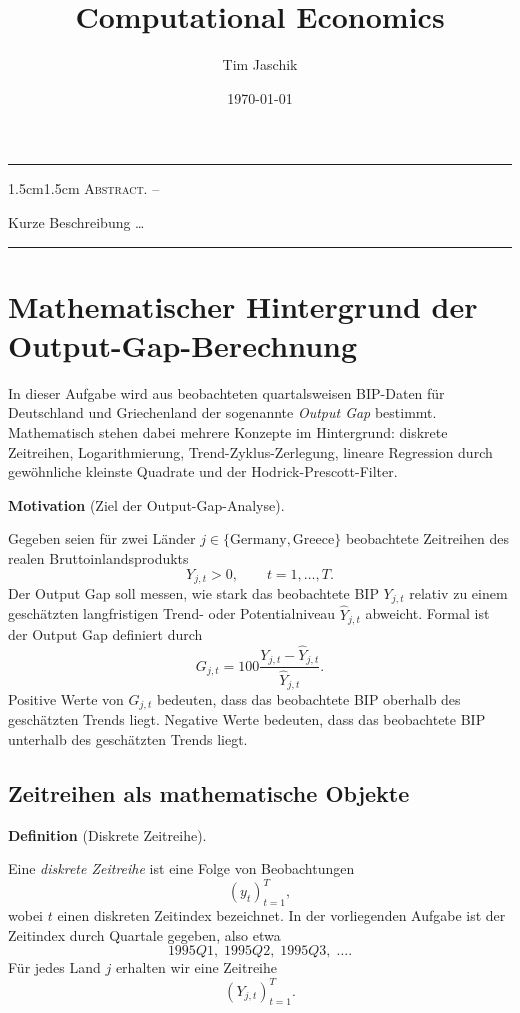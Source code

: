 \documentclass[10pt, letterpaper]{article}
\title{Computational Economics}
\author{Tim Jaschik}
\date{\today}
\renewenvironment{abstract}
  {
    \begin{adjustwidth}{1.5cm}{1.5cm}
    \small
    \textsc{Abstract. –}%
  }
  {
    \end{adjustwidth}
  }
\newcommand{\CustomHeading}[3]{%
  \par\medskip\noindent%
  \textbf{#1 #2} \textnormal{(#3)}.\enskip%
}
\newenvironment{DEF}[2]{\CustomHeading{Definition}{#1}{#2}}{}
\newenvironment{MOT}[2]{\CustomHeading{Motivation}{#1}{#2}}{}
\begin{document}
\maketitle
\rule{\textwidth}{0.5pt}
\begin{abstract}
Kurze Beschreibung …
\end{abstract}
\rule{\textwidth}{0.5pt}
\vspace{0.5cm}

\tableofcontents

\pagebreak


\section{Mathematischer Hintergrund der Output-Gap-Berechnung}

In dieser Aufgabe wird aus beobachteten quartalsweisen BIP-Daten für Deutschland und Griechenland der sogenannte \emph{Output Gap} bestimmt. Mathematisch stehen dabei mehrere Konzepte im Hintergrund: diskrete Zeitreihen, Logarithmierung, Trend-Zyklus-Zerlegung, lineare Regression durch gewöhnliche kleinste Quadrate und der Hodrick-Prescott-Filter.

\begin{MOT}{}{Ziel der Output-Gap-Analyse}
Gegeben seien für zwei Länder \(j\in\{\mathrm{Germany},\mathrm{Greece}\}\) beobachtete Zeitreihen des realen Bruttoinlandsprodukts
\[
Y_{j,t}>0,
\qquad t=1,\dots,T.
\]
Der Output Gap soll messen, wie stark das beobachtete BIP \(Y_{j,t}\) relativ zu einem geschätzten langfristigen Trend- oder Potentialniveau \(\widehat{Y}_{j,t}\) abweicht. Formal ist der Output Gap definiert durch
\[
G_{j,t}
=
100\frac{Y_{j,t}-\widehat{Y}_{j,t}}{\widehat{Y}_{j,t}}.
\]
Positive Werte von \(G_{j,t}\) bedeuten, dass das beobachtete BIP oberhalb des geschätzten Trends liegt. Negative Werte bedeuten, dass das beobachtete BIP unterhalb des geschätzten Trends liegt.
\end{MOT}

\subsection{Zeitreihen als mathematische Objekte}

\begin{DEF}{}{Diskrete Zeitreihe}
Eine \emph{diskrete Zeitreihe} ist eine Folge von Beobachtungen
\[
(y_t)_{t=1}^T,
\]
wobei \(t\) einen diskreten Zeitindex bezeichnet. In der vorliegenden Aufgabe ist der Zeitindex durch Quartale gegeben, also etwa
\[
1995Q1,\;1995Q2,\;1995Q3,\;\dots.
\]
Für jedes Land \(j\) erhalten wir eine Zeitreihe
\[
(Y_{j,t})_{t=1}^T.
\]
\end{DEF}
\end{document}
